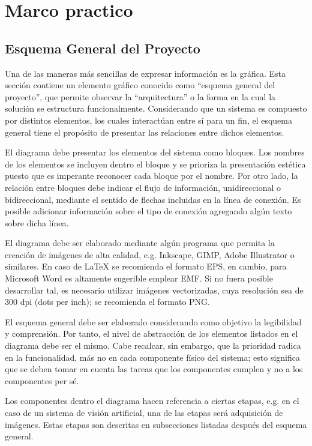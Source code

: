 \chapter{Marco practico}
\label{sec:practico}
\section{Esquema General del Proyecto}
Una de las maneras más sencillas de expresar información es la gráfica. Esta sección contiene un elemento gráfico conocido como “esquema general del proyecto”, que permite observar la “arquitectura” o la forma en la cual la solución se estructura funcionalmente. Considerando que un sistema es compuesto por distintos elementos, los cuales interactúan entre sí para un fin, el esquema general tiene el propósito de presentar las relaciones entre dichos elementos.

El diagrama debe presentar los elementos del sistema como bloques. Los nombres de los elementos se incluyen dentro el bloque y se prioriza la presentación estética puesto que es imperante reconocer cada bloque por el nombre. Por otro lado, la relación entre bloques debe indicar el flujo de información, unidireccional o bidireccional, mediante el sentido de flechas incluidas en la línea de conexión. Es posible adicionar información sobre el tipo de conexión agregando algún texto sobre dicha línea. 

El diagrama debe ser elaborado mediante algún programa que permita la creación de imágenes de alta calidad, e.g. Inkscape, GIMP, Adobe Illustrator o similares. En caso de LaTeX se recomienda el formato EPS, en cambio, para Microsoft Word es altamente sugerible emplear EMF. Si no fuera posible desarrollar tal, es necesario utilizar imágenes vectorizadas, cuya resolución sea de 300 dpi (dots per inch); se recomienda el formato PNG.

El esquema general debe ser elaborado considerando como objetivo la legibilidad y comprensión. Por tanto, el nivel de abstracción de los elementos listados en el diagrama debe ser el mismo. Cabe recalcar, sin embargo, que la prioridad radica en la funcionalidad, más no en cada componente físico del sistema; esto significa que se deben tomar en cuenta las tareas que los componentes cumplen y no a los componentes per sé.

Los componentes dentro el diagrama hacen referencia a ciertas etapas, e.g. en el caso de un sistema de visión artificial, una de las etapas será adquisición de imágenes. Estas etapas son descritas en subsecciones listadas después del esquema general.

